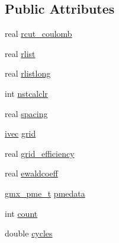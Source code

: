 \subsection*{\-Public \-Attributes}
\begin{DoxyCompactItemize}
\item 
real \hyperlink{structpme__setup__t_a10b26bc4762a645db835d9e55df7324c}{rcut\-\_\-coulomb}
\item 
real \hyperlink{structpme__setup__t_a01a006cd83c234af97b61b5993c844b4}{rlist}
\item 
real \hyperlink{structpme__setup__t_ab4a46ea523127243e4de38674a879160}{rlistlong}
\item 
int \hyperlink{structpme__setup__t_a41202462de6d9847a22aeaca57dd3be5}{nstcalclr}
\item 
real \hyperlink{structpme__setup__t_ad20a98a5caee6d6ec79b9337e6ba5aee}{spacing}
\item 
\hyperlink{share_2template_2gromacs_2types_2simple_8h_a74f6ffdb4a9c1764f5293969d8c681b6}{ivec} \hyperlink{structpme__setup__t_a802011c5154d75f85f8350703a3cc57a}{grid}
\item 
real \hyperlink{structpme__setup__t_af9bc7fe8d120a9ce09fb34dbb13c5e02}{grid\-\_\-efficiency}
\item 
real \hyperlink{structpme__setup__t_ac084e20c11e6a5f8f99ca2f06e99cc87}{ewaldcoeff}
\item 
\hyperlink{include_2types_2forcerec_8h_a743d59574a3e2fb4fefedd7e0392a35c}{gmx\-\_\-pme\-\_\-t} \hyperlink{structpme__setup__t_a7414b6b90e6922cf392907179a5a5044}{pmedata}
\item 
int \hyperlink{structpme__setup__t_a3b42714e7433639d924b45d6ee89dffa}{count}
\item 
double \hyperlink{structpme__setup__t_a6dcf8a73c5f07dff8afa7371cef87bd9}{cycles}
\end{DoxyCompactItemize}


